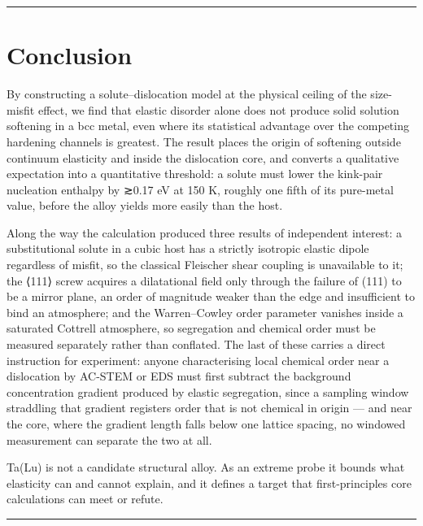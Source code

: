 \begin{center}\rule{0.5\linewidth}{0.5pt}\end{center}

\hypertarget{conclusion}{%
\section{Conclusion}\label{sec:conclusion}}

By constructing a solute--dislocation model at the physical ceiling of the size-misfit effect, we find that elastic disorder alone does not produce solid solution softening in a bcc metal, even where its statistical advantage over the competing hardening channels is greatest. The result places the origin of softening outside continuum elasticity and inside the dislocation core, and converts a qualitative expectation into a quantitative threshold: a solute must lower the kink-pair nucleation enthalpy by ≳0.17 eV at 150 K, roughly one fifth of its pure-metal value, before the alloy yields more easily than the host.

Along the way the calculation produced three results of independent interest: a substitutional solute in a cubic host has a strictly isotropic elastic dipole regardless of misfit, so the classical Fleischer shear coupling is unavailable to it; the ⟨111⟩ screw acquires a dilatational field only through the failure of (111) to be a mirror plane, an order of magnitude weaker than the edge and insufficient to bind an atmosphere; and the Warren--Cowley order parameter vanishes inside a saturated Cottrell atmosphere, so segregation and chemical order must be measured separately rather than conflated. The last of these carries a direct instruction for experiment: anyone characterising local chemical order near a dislocation by AC-STEM or EDS must first subtract the background concentration gradient produced by elastic segregation, since a sampling window straddling that gradient registers order that is not chemical in origin --- and near the core, where the gradient length falls below one lattice spacing, no windowed measurement can separate the two at all.

Ta(Lu) is not a candidate structural alloy. As an extreme probe it bounds what elasticity can and cannot explain, and it defines a target that first-principles core calculations can meet or refute.

\begin{center}\rule{0.5\linewidth}{0.5pt}\end{center}

